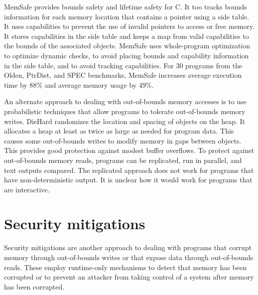 MemSafe \cite{Simpson2013} provides bounds safety and lifetime safety for C.
It too tracks bounds information for each memory location that contains a 
pointer using a side table.  It uses capabilities to prevent the use of
invalid pointers to access or free memory.  It stores capabilities in the side 
table and keeps a map from valid capabilities to the bounds of the associated objects.
MemSafe uses whole-program optimization to optimize dynamic checks, to avoid placing bounds and capability information in the side table, and to avoid tracking 
capabilities. For 30 programs from the Olden, 
PtrDist, and SPEC benchmarks, MemSafe increases average execution time by 88\%
and average memory usage by 49\%.

An alternate approach to dealing with out-of-bounds memory accesses is to
use probabilistic techniques that allow programs to tolerate out-of-bounds
memory writes.   DieHard \cite{Berger2006} randomizes the location and spacing of 
objects on the heap.  It allocates a heap at least as twice as large as needed for
program data.    This causes some out-of-bounds writes to modify memory in gaps
between objects.  This provides good protection against modest buffer overflows. 
To protect against out-of-bounds memory reads, programs
can be replicated, run in parallel, and text outputs compared.  The replicated
approach does not work for programs that have non-deterministic output. It is 
unclear how it would work for programs that are interactive.

\section{Security mitigations}
Security mitigations are another approach to dealing with programs that corrupt memory
through out-of-bounds writes or that expose data through out-of-bounds
reads.   These employ runtime-only mechanisms to detect that memory has been
corrupted or to prevent an attacker from taking control of a system after
memory has been corrupted.

